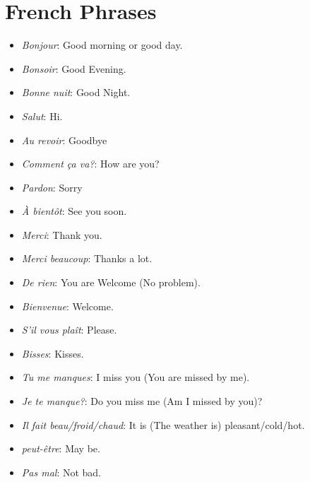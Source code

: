 \section{French Phrases}

\begin{itemize}

\item{\emph{Bonjour}: Good morning or good day.} 

\item{\emph{Bonsoir}: Good Evening.} 

\item{\emph{Bonne nuit}: Good Night.} 

\item{\emph{Salut}: Hi.} 

\item{\emph{Au revoir}: Goodbye} 

\item{\emph{Comment \c{c}a va?}: How are you?} 

\item{\emph{Pardon}: Sorry} 

\item{\emph{\`{A} bient\^{o}t}: See you soon.} 

\item{\emph{Merci}: Thank you.} 

\item{\emph{Merci beaucoup}: Thanks a lot.} 

\item{\emph{De rien}: You are Welcome (No problem).} 

\item{\emph{Bienvenue}: Welcome.}

\item{\emph{S'il vous pla\^it}: Please.} 

\item{\emph{Bisses}: Kisses.} 

\item{\emph{Tu me manques}: I miss you (You are missed by me).} 

\item{\emph{Je te manque?}: Do you miss me (Am I missed by you)?} 

\item{\emph{Il fait beau/froid/chaud}: It is (The weather is)
pleasant/cold/hot.} 

\item{\emph{peut-\^etre}: May be.} 

\item{\emph{Pas mal}: Not bad.} 


\end{itemize}
